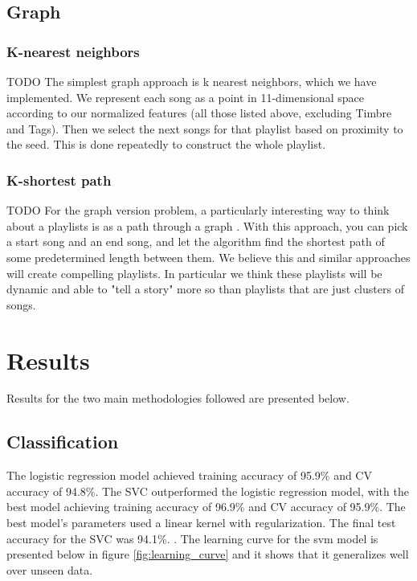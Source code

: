 \documentclass[acmtog]{acmart}
\begin{document}
\subsection{Graph}

\subsubsection{K-nearest neighbors}
TODO
The simplest graph approach is k nearest neighbors, which we have implemented. We represent each song as a point in 11-dimensional space according to our normalized features (all those listed above, excluding Timbre and Tags). Then we select the next songs for that playlist based on proximity to the seed. This is done repeatedly to construct the whole playlist.

\subsubsection{K-shortest path}
TODO
For the graph version problem, a particularly interesting way to think about a playlists is as a path through a graph \cite{Alghoniemy01anetwork}. With this approach, you can pick a start song and an end song, and let the algorithm find the shortest path of some predetermined length between them. We believe this and similar approaches will create compelling playlists. In particular we think these playlists will be dynamic and able to "tell a story" more so than playlists that are just clusters of songs.

\section{Results}

Results for the two main methodologies followed are presented below.

\subsection{Classification}
The logistic regression model achieved training accuracy of 95.9\% and CV accuracy of 94.8\%. The SVC outperformed the logistic regression model, with the best model achieving training accuracy of 96.9\% and CV accuracy of 95.9\%. The best model's parameters used a linear kernel with regularization. The final test accuracy for the SVC was 94.1\%. .
The learning curve for the svm model is presented below in figure \ref{fig:learning_curve} and it shows that it generalizes well over unseen data.
\newline
\end{document}
